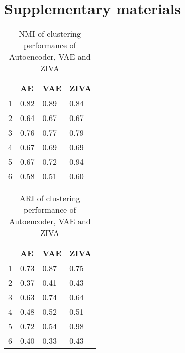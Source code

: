 \section{Supplementary materials}

\begin{table}[htb!]
\centering
\caption{scRNA-seq datasets used in this study}
\label{datasets}
\end{table}

\begin{table}[htb!]
\centering
\caption{NMI of clustering performance of Autoencoder, VAE and ZIVA}
\label{nmi3ae}
\begin{tabular}{llll}
\hline
  & AE   & VAE  & ZIVA \\ \hline
1 & 0.82 & 0.89 & 0.84 \\
2 & 0.64 & 0.67 & 0.67 \\
3 & 0.76 & 0.77 & 0.79 \\
4 & 0.67 & 0.69 & 0.69 \\
5 & 0.67 & 0.72 & 0.94 \\
6 & 0.58 & 0.51 & 0.60 \\ \hline
\end{tabular}
\end{table}

\begin{table}[htb!]
\centering
\caption{ARI of clustering performance of Autoencoder, VAE and ZIVA}
\label{ari3ae}
\begin{tabular}{llll}
\hline
  & AE   & VAE  & ZIVA \\ \hline
1 & 0.73 & 0.87 & 0.75 \\
2 & 0.37 & 0.41 & 0.43 \\
3 & 0.63 & 0.74 & 0.64 \\
4 & 0.48 & 0.52 & 0.51 \\
5 & 0.72 & 0.54 & 0.98 \\
6 & 0.40 & 0.33 & 0.43 \\ \hline
\end{tabular}
\end{table}

